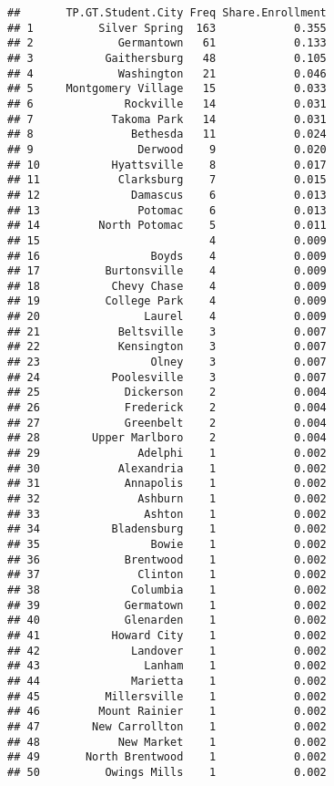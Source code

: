 \documentclass[]{article}
\begin{document}
\begin{verbatim}
##       TP.GT.Student.City Freq Share.Enrollment
## 1          Silver Spring  163            0.355
## 2             Germantown   61            0.133
## 3           Gaithersburg   48            0.105
## 4             Washington   21            0.046
## 5     Montgomery Village   15            0.033
## 6              Rockville   14            0.031
## 7            Takoma Park   14            0.031
## 8               Bethesda   11            0.024
## 9                Derwood    9            0.020
## 10           Hyattsville    8            0.017
## 11            Clarksburg    7            0.015
## 12              Damascus    6            0.013
## 13               Potomac    6            0.013
## 14         North Potomac    5            0.011
## 15                          4            0.009
## 16                 Boyds    4            0.009
## 17          Burtonsville    4            0.009
## 18           Chevy Chase    4            0.009
## 19          College Park    4            0.009
## 20                Laurel    4            0.009
## 21            Beltsville    3            0.007
## 22            Kensington    3            0.007
## 23                 Olney    3            0.007
## 24           Poolesville    3            0.007
## 25             Dickerson    2            0.004
## 26             Frederick    2            0.004
## 27             Greenbelt    2            0.004
## 28        Upper Marlboro    2            0.004
## 29               Adelphi    1            0.002
## 30            Alexandria    1            0.002
## 31             Annapolis    1            0.002
## 32               Ashburn    1            0.002
## 33                Ashton    1            0.002
## 34           Bladensburg    1            0.002
## 35                 Bowie    1            0.002
## 36             Brentwood    1            0.002
## 37               Clinton    1            0.002
## 38              Columbia    1            0.002
## 39             Germatown    1            0.002
## 40             Glenarden    1            0.002
## 41           Howard City    1            0.002
## 42              Landover    1            0.002
## 43                Lanham    1            0.002
## 44              Marietta    1            0.002
## 45          Millersville    1            0.002
## 46         Mount Rainier    1            0.002
## 47        New Carrollton    1            0.002
## 48            New Market    1            0.002
## 49       North Brentwood    1            0.002
## 50          Owings Mills    1            0.002

\end{verbatim}
\end{document}
